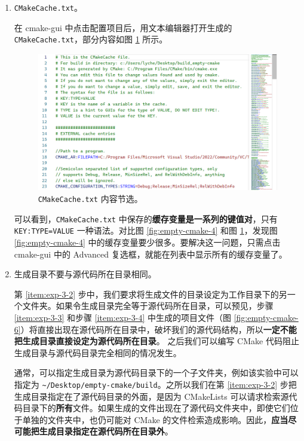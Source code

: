 \begin{enumerate}
	\item \lstinline[language={}]{CMakeCache.txt}。

	在 cmake-gui 中点击配置项目后，用文本编辑器打开生成的 \lstinline[language={}]{CMakeCache.txt}，部分内容如图 \ref{fig:cmake-cache} 所示。

	\begin{figure}[H]
		\centering
		\includegraphics[width=0.8\linewidth]{assets/cmake-cache}
		\caption{\lstinline[language={}]{CMakeCache.txt} 内容节选。}
		\label{fig:cmake-cache}
	\end{figure}

	可以看到，\lstinline[language={}]{CMakeCache.txt} 中保存的\textbf{缓存变量是一系列的键值对}，只有 \lstinline[language={}]{KEY:TYPE=VALUE} 一种语法。对比图 \ref{fig:empty-cmake-4} 和图 \ref{fig:cmake-cache}，发现图 \ref{fig:empty-cmake-4} 中的缓存变量要少很多。要解决这一问题，只需点击 cmake-gui 中的 Advanced 复选框，就能在列表中显示所有的缓存变量了。

	\item 生成目录不要与源代码所在目录相同。

	第 \ref{item:exp-3-2} 步中，我们要求将生成文件的目录设定为工作目录下的另一个文件夹。如果令生成目录完全等于源代码所在目录，可以预见，步骤 \ref{item:exp-3-3} 和步骤 \ref{item:exp-3-4} 中生成的项目文件（图 \ref{fig:empty-cmake-6}）将直接出现在源代码所在目录中，破坏我们的源代码结构，所以\textbf{一定不能把生成目录直接设定为源代码所在目录}。
	之后我们可以编写 CMake 代码阻止生成目录与源代码目录完全相同的情况发生。

	通常，可以指定生成目录为源代码目录下的一个子文件夹，例如该实验中可以指定为 \lstinline[language={}]{~/Desktop/empty-cmake/build}。之所以我们在第 \ref{item:exp-3-2} 步把生成目录指定在了源代码目录的外面，是因为 CMakeLists 可以请求检索源代码目录下的\textbf{所有}文件。如果生成的文件出现在了源代码文件夹中，即使它们位于单独的文件夹中，也仍可能对 CMake 的文件检索造成影响。因此，\textbf{应当尽可能把生成目录指定在源代码所在目录外}。

\end{enumerate}
